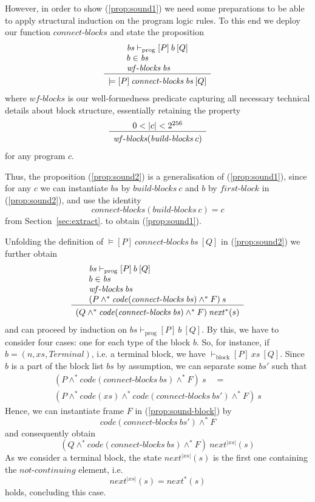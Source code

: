 \documentclass[sigplan,10pt,review]{acmart}\settopmatter{printfolios=true,printccs=false,printacmref=false}
\newcommand{\sconj}{\wedge^*}
\newcommand{\tvalid}[3]{\models[#1]\:#2\:[#3]}
\newcommand{\ttrip}[5]{\mathit{#1} \vdash_{\mathrm{#2}}[#3]\:#4\:[#5]}
\newcommand{\xnext}{\mathit{next}}
\newcommand{\code}[1]{\mathit{code}(#1)}
\newcommand{\ncont}{\mathit{not\mbox{-}continuing}}
\newcommand{\RuleC}[2]{\begin{array}{c}#1\\\hline\noalign{\smallskip}#2\end{array}}
\newcommand{\bblocks}{\mathit{build\mbox{-}blocks}}
\newcommand{\cblocks}{\mathit{connect\mbox{-}blocks}}
\newcommand{\fblock}{\mathit{first\mbox{-}block}}
\newcommand{\len}[1]{|#1|}
\newcommand{\wfblocks}{\mathit{wf\mbox{-}blocks}}
\begin{document}
However, in order to show (\ref{prop:sound1}) we need some preparations to be able to apply
structural induction on the program logic rules. To this end we deploy our function $\cblocks$
and state the proposition
\begin{equation}
\label{prop:sound2}
\RuleC{\begin{array}{l}
       \ttrip{\mathit{bs}}{prog}{P}{b}{Q} \\
       b \in \mathit{bs}\\
       \wfblocks\:\mathit{bs}
       \end{array}}
{\tvalid{P}{\cblocks \: \mathit{bs}}{Q}}
\end{equation}
where $\wfblocks$ is our well-formedness predicate capturing all necessary technical details about block
structure, essentially retaining the property 
\[
\RuleC{0 < \len{c} < 2^{256}}
{\wfblocks(\bblocks \: c)}
\] 
for any program $c$. 

Thus, the proposition (\ref{prop:sound2}) is a generalisation of
(\ref{prop:sound1}), since for any $c$ we can instantiate $\mathit{bs}$ by $\bblocks \: c$ 
and $b$ by $\fblock$ in (\ref{prop:sound2}), and use the identity 
\[
\cblocks(\bblocks\:c) = c
\] 
from Section~\ref{sec:extract}.
to obtain (\ref{prop:sound1}). 

Unfolding the definition of $\tvalid{P}{\cblocks \: \mathit{bs}}{Q}$ in
(\ref{prop:sound2}) we further obtain
\begin{equation}
\label{prop:sound3}
\RuleC{\begin{array}{l}
       \ttrip{\mathit{bs}}{prog}{P}{b}{Q} \\
       b \in \mathit{bs}\\
       \wfblocks\:\mathit{bs} \\
      (P \sconj \code{\cblocks \: \mathit{bs}} \sconj F)\: s
       \end{array}}
{(Q \sconj \code{\cblocks \: \mathit{bs}} \sconj F)\: \xnext^*(s)}
\end{equation}
and can proceed by induction on $\ttrip{\mathit{bs}}{prog}{P}{b}{Q}$.
By this, we have to consider four cases: one for each type of the block $b$.
So, for instance, if $b = (n, \mathit{xs}, \mathit{Terminal})$, i.e. a terminal block,
we have $\ttrip{}{block}{P}{\mathit{xs}}{Q}$. 
Since $b$ is a part of the block list $\mathit{bs}$ by assumption, we can separate some $\mathit{bs'}$ 
such that 
\[
\begin{array}{l}
(P \sconj \code{\cblocks \: \mathit{bs}} \sconj F)\: s \quad = \\
(P \sconj \code{\mathit{xs}} \sconj \code{\cblocks \: \mathit{bs'}} \sconj F)\: s 
\end{array}
\] 
Hence, we can instantiate frame $F$ in (\ref{prop:sound-block}) by
\[
\code{\cblocks \: \mathit{bs}'} \sconj F
\]
and consequently obtain 
\[
(Q \sconj \code{\cblocks \: \mathit{bs}} \sconj F)\: \xnext^{\len{\mathit{xs}}}(s)
\]
As we consider a terminal block, the state 
$\xnext^{\len{\mathit{xs}}}(s)$ is the first one containing the $\ncont$ element, i.e.
\[
\xnext^{\len{\mathit{xs}}}(s) = \xnext^*(s)
\]
holds, concluding this case.
\end{document}
